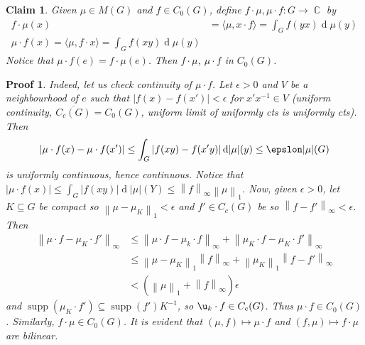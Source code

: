 \documentclass[11pt, a4paper]{memoir}
\DeclareMathOperator{\C}{{\mathbb{C}}}
\newcommand{\norm}[1]{\ensuremath{\left\lVert#1\right\rVert}}
\theoremstyle{change}
\theoremstyle{plain}
\newtheorem{claim}{Claim}
\theoremstyle{nonumberplain}
\newtheorem{nmproof}{Proof}
\DeclareMathOperator{\supp}{supp}
\renewcommand{\d}[1]{\ensuremath{\operatorname{d}\!{#1}}}
\numberwithin{equation}{section}
\begin{document}
\begin{claim}
    Given $\mu\in M(G)$ and $f\in C_0(G)$, define $f\cdot\mu,\mu\cdot f:G\to\C$ by
    \begin{align*}
        f\cdot\mu(x) &=\langle \mu,x\cdot f\rangle=\int_G f(yx)\d{\mu(y)}\\
        \mu\cdot f(x)=\langle\mu,f\cdot x\rangle=\int_Gf(xy)\d{\mu(y)}
    \end{align*}
    Notice that $\mu\cdot f(e)=f\cdot\mu(e)$.
    Then $f\cdot\mu$, $\mu\cdot f$ in $C_0(G)$.
\end{claim}
\begin{nmproof}
    Indeed, let us check continuity of $\mu\cdot f$.
    Let $\epsilon>0$ and $V$ be a neighbourhood of $e$ such that $|f(x)-f(x')|<\epsilon$ for $x'x^{-1}\in V$ (uniform continuity, $\overline{C_c(G)}=C_0(G)$, uniform limit of uniformly cts is uniformly cts).
    Then
    \begin{equation*}
        |\mu\cdot f(x)-\mu\cdot f(x')|\leq\int_G|f(xy)-f(x'y)|\d{|\mu|(y)}\leq\epslon|\mu|(G)
    \end{equation*}
    is uniformly continuous, hence continuous.
    Notice that $|\mu\cdot f(x)|\leq\int_G|f(xy)|\d{|\mu|(Y)}\leq\norm{f}_\infty\norm{\mu}_1$.
    Now, given $\epsilon>0$, let $K\subseteq G$ be compact so $\norm{\mu-\mu_K}_1<\epsilon$ and $f'\in C_c(G)$ be so $\norm{f-f'}_\infty<\epsilon$.
    Then
    \begin{align*}
        \norm{\mu\cdot f-\mu_K\cdot f'}_\infty&\leq\norm{\mu\cdot f-\mu_k\cdot f}_\infty+\norm{\mu_K\cdot f-\mu_K\cdot f'}_\infty\\
                                              &\leq\norm{\mu-\mu_K}_1\norm{f}_\infty+\norm{\mu_K}_1\norm{f-f'}_\infty\\
                                              &< (\norm{\mu}_1+\norm{f}_\infty)\epsilon
    \end{align*}
    and $\supp(\mu_K\cdot f')\subseteq\supp(f')K^{-1}$, so $\u_k\cdot f\in C_c(G)$.
    Thus $\mu\cdot f\in C_0(G)$.
    Similarly, $f\cdot\mu\in C_0(G)$.
    It is evident that $(\mu,f)\mapsto\mu\cdot f$ and $(f,\mu)\mapsto f\cdot\mu$ are bilinear.
\end{nmproof}
\end{document}

